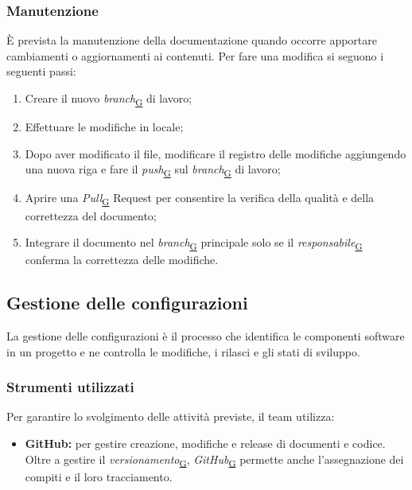 \documentclass[a4paper,12pt]{article}
\begin{document}
    \subsubsection{Manutenzione}
    \label{subsubsec:maint}
        È prevista la manutenzione della documentazione quando occorre apportare cambiamenti o aggiornamenti ai contenuti. Per fare una modifica si seguono i seguenti passi: 
        \begin{enumerate}
           \item Creare il nuovo \textit{branch}\textsubscript{\href{https://atlasteam9.github.io/Atlas/glossario.html\#Branch}{G}} di lavoro; 
           \item Effettuare le modifiche in locale;
           \item Dopo aver modificato il file, modificare il registro delle modifiche aggiungendo una nuova riga e fare il \textit{push}\textsubscript{\href{https://atlasteam9.github.io/Atlas/glossario.html\#Push}{G}} sul \textit{branch}\textsubscript{\href{https://atlasteam9.github.io/Atlas/glossario.html\#Branch}{G}} di lavoro;
           \item Aprire una \textit{Pull}\textsubscript{\href{https://atlasteam9.github.io/Atlas/glossario.html\#Pull}{G}} Request per consentire la verifica della qualità e della correttezza del documento;
           \item Integrare il documento nel \textit{branch}\textsubscript{\href{https://atlasteam9.github.io/Atlas/glossario.html\#Branch}{G}} principale solo se il \textit{responsabile}\textsubscript{\href{https://atlasteam9.github.io/Atlas/glossario.html\#Responsabile}{G}} conferma la correttezza delle modifiche.
        \end{enumerate}

        

    \subsection{Gestione delle configurazioni}
        La gestione delle configurazioni è il processo che identifica le componenti software in un progetto e ne controlla le modifiche, i rilasci e gli stati di sviluppo.

        \subsubsection{Strumenti utilizzati}
            Per garantire lo svolgimento delle attività previste, il team utilizza:
            \begin{itemize}
                \item \textbf{GitHub:} per gestire creazione, modifiche e release di documenti e codice. Oltre a gestire il \textit{versionamento}\textsubscript{\href{https://atlasteam9.github.io/Atlas/glossario.html\#Versionamento}{G}}, \textit{GitHub}\textsubscript{\href{https://atlasteam9.github.io/Atlas/glossario.html\#GitHub}{G}} permette anche l'assegnazione dei compiti e il loro tracciamento.
            \end{itemize}
        
\end{document}
